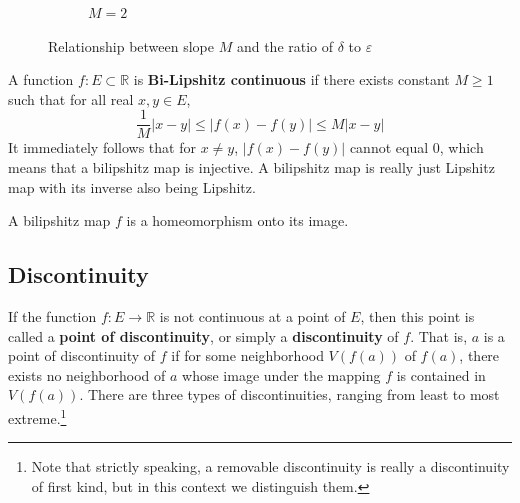 \begin{figure}[H]
\begin{subfigure}[b]{0.32\textwidth}
      \caption{$M = 2$}
    \end{subfigure}
    \caption{Relationship between slope $M$ and the ratio of $\delta$ to $\varepsilon$}
    \label{fig:slope-epsilon-delta}
  \end{figure}

  \begin{definition}
    A function $f: E \subset \mathbb{R}$ is \textbf{Bi-Lipshitz continuous} if there exists constant $M\geq 1$ such that for all real $x, y \in E$, 
    \[ \frac{1}{M} |x - y| \leq |f(x) - f(y)| \leq M |x - y|\]
    It immediately follows that for $x \neq y$, $ |f(x) - f(y)|$ cannot equal $0$, which means that a bilipshitz map is injective. A bilipshitz map is really just Lipshitz map with its inverse also being Lipshitz. 
  \end{definition}

  \begin{theorem}
    A bilipshitz map $f$ is a homeomorphism onto its image. 
  \end{theorem}

\subsection{Discontinuity}

  If the function $f: E \longrightarrow \mathbb{R}$ is not continuous at a point of $E$, then this point is called a \textbf{point of discontinuity}, or simply a \textbf{discontinuity} of $f$. That is, $a$ is a point of discontinuity of $f$ if for some neighborhood $V(f(a))$ of $f(a)$, there exists no neighborhood of $a$ whose image under the mapping $f$ is contained in $V(f(a))$. There are three types of discontinuities, ranging from least to most extreme.\footnote{Note that strictly speaking, a removable discontinuity is really a discontinuity of first kind, but in this context we distinguish them. } 


